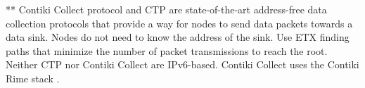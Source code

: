 
**
Contiki Collect protocol and CTP are state-of-the-art address-free data collection protocols that provide a way for nodes to send data packets towards a data sink. Nodes do not need to know the address of the sink. Use ETX finding paths that minimize the number of packet transmissions to reach the root. Neither CTP nor Contiki Collect are IPv6-based. Contiki Collect uses the Contiki Rime stack \cite{beyondInteroperability}.

